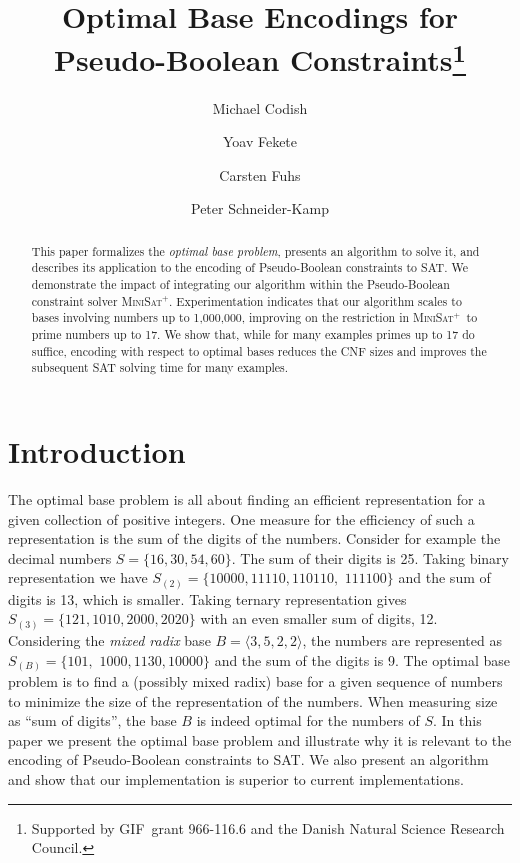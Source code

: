 \documentclass[envcountsame]{llncs}
\title{Optimal Base Encodings for\\
       Pseudo-Boolean Constraints\thanks{Supported by GIF\ grant
       966-116.6 and the Danish Natural Science Research Council.}
       }
\author{    Michael Codish\inst{1}
            \and
            Yoav Fekete\inst{1}
            \and
            Carsten Fuhs\inst{2}
            \and
            Peter Schneider-Kamp\inst{3}
}
\institute{
	Department of Computer Science, 
        Ben Gurion University of the Negev, Israel
\and 	  
	LuFG Informatik 2, RWTH Aachen University, Germany 
\and 	  
        IMADA, University of Southern Denmark, Denmark
}
\newcommand\tuple[1]{\langle #1 \rangle}
\newcommand\minisatp{\textsc{MiniSat$^+$}}
\begin{document}
\maketitle

\begin{abstract}
  This paper formalizes the \emph{optimal base problem}, presents an
  algorithm to solve it, and describes its application to the encoding
  of Pseudo-Boolean constraints to SAT.  We demonstrate the impact of
  integrating our algorithm within the Pseudo-Boolean constraint
  solver \minisatp.  Experimentation indicates that our algorithm
  scales to bases involving numbers up to 1,000,000, improving on the
  restriction in \minisatp\ to prime numbers up to 17.  We show that,
  while for many examples primes up to 17 do suffice, encoding with
  respect to optimal bases 
reduces the CNF sizes and improves the subsequent SAT solving
  time for many examples.
\end{abstract}

\section{Introduction}

The optimal base problem is all about finding an efficient
representation for a given collection of positive integers. One
measure for the efficiency of such a representation is the sum of the
digits of the numbers.  Consider for example the decimal numbers
$S=\{16,30,54,60\}$. The sum of their digits is 25.  Taking binary
representation we have $S_{(2)}=\{10000,11110,110110,$ $111100\}$ and
the sum of digits is 13, which is smaller. Taking ternary
representation gives $S_{(3)}=\{121,1010,2000,2020\}$ with an even
smaller sum of digits, 12. Considering the \emph{mixed radix} base
$B=\tuple{3,5,2,2}$, the numbers are represented as $S_{(B)}=\{101,$
$1000,1130,10000\}$ and the sum of the digits is 9.  The optimal base
problem is to find a (possibly mixed radix) base for a given sequence
of numbers to minimize the size of the representation of the
numbers. When measuring size as ``sum of digits'', the base $B$ is
indeed optimal for the numbers of $S$. In this paper we present the
optimal base problem and illustrate why it is relevant to the encoding
of Pseudo-Boolean constraints to SAT.
We also present an algorithm and show that our implementation is
superior to current implementations.
\end{document}
